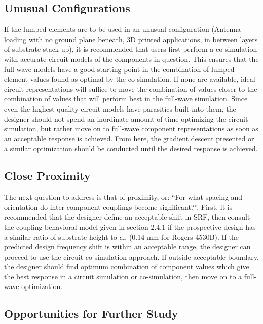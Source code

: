 \documentclass[12pt]{usfcoe}
\begin{document}
    \subsection{Unusual Configurations}

    If the lumped elements are to be used in an unusual configuration (Antenna loading with no ground plane beneath, 3D printed applications, in between layers of substrate stack up), it is recommended that users first perform a co-simulation with accurate circuit models of the components in question.
    This ensures that the full-wave models have a good starting point in the combination of lumped element values found as optimal by the co-simulation.
    If none are available, ideal circuit representations will suffice to move the combination of values closer to the combination of values that will perform best in the full-wave simulation.
    Since even the highest quality circuit models have parasitics built into them, the designer should not spend an inordinate amount of time optimizing the circuit simulation, but rather move on to full-wave component representations as soon as an acceptable response is achieved. 
    From here, the gradient descent presented or a similar optimization should be conducted until the desired response is achieved.

    \subsection{Close Proximity}

    \indent The next question to address is that of proximity, or: ``For what spacing and orientation do inter-component couplings become significant?''. 
    First, it is recommended that the designer define an acceptable shift in SRF, then consult the coupling behavioral model given in section 2.4.1 if the prospective design has a similar ratio of substrate height to $\epsilon_r$, (0.14 mm for Rogers 4530B).
    If the predicted design frequency shift is within an acceptable range, the designer can proceed to use the circuit co-simulation approach.
    If outside acceptable boundary, the designer should find optimum combination of component values which give the best response in a circuit simulation or co-simulation, then move on to a full-wave optimization. 
        
    \subsection{Opportunities for Further Study}
\end{document}
